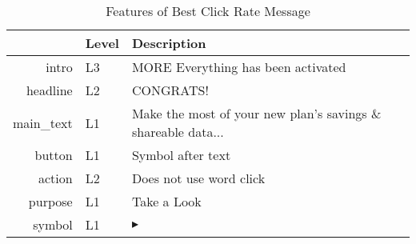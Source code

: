 \begin{table}[ht]
\centering
\caption{Features of Best Click Rate Message} 
\label{tab:best_click}
\begin{tabular}{rll}
  \hline
 & Level & Description \\ 
  \hline
intro & L3 & MORE Everything has been activated \\ 
  headline & L2 & CONGRATS! \\ 
  main\_text & L1 & Make the most of your new plan’s savings \& shareable data... \\ 
  button & L1 & Symbol after text \\ 
  action & L2 & Does not use word click \\ 
  purpose & L1 & Take a Look \\ 
  symbol & L1 & $\blacktriangleright$ \\ 
   \hline
\end{tabular}
\end{table}

